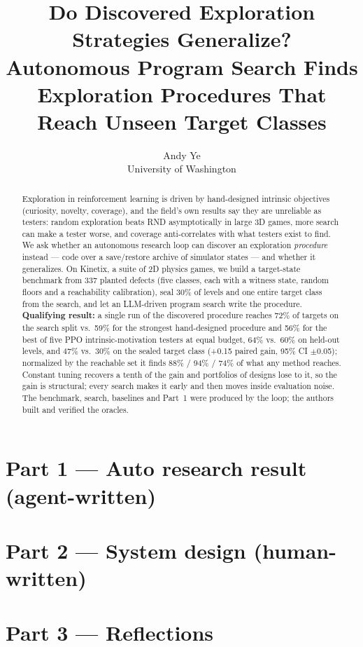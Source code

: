 \documentclass[10pt]{article}
\title{Do Discovered Exploration Strategies Generalize?\\Autonomous Program Search Finds Exploration Procedures That Reach Unseen Target Classes}
\author{Andy Ye \\ University of Washington}
\begin{document}
\maketitle
\begin{abstract}
Exploration in reinforcement learning is driven by hand-designed intrinsic objectives (curiosity, novelty, coverage), and the
field's own results say they are unreliable as testers: random exploration beats RND asymptotically in large 3D games, more search
can make a tester worse, and coverage anti-correlates with what testers exist to find. We ask whether an autonomous research loop can
discover an exploration \emph{procedure} instead --- code over a save/restore archive of simulator states --- and whether it generalizes.
On Kinetix, a suite of 2D physics games, we build a target-state benchmark from 337 planted defects (five classes, each with a witness
state, random floors and a reachability calibration), seal 30\% of levels and one entire target class from the search, and let an
LLM-driven program search write the procedure. \textbf{Qualifying result:} a single run of the discovered procedure reaches 72\% of
targets on the search split vs.\ 59\% for the strongest hand-designed procedure and 56\% for the best of five PPO intrinsic-motivation
testers at equal budget, 64\% vs.\ 60\% on held-out levels, and 47\% vs.\ 30\% on the sealed target class (+0.15 paired gain, 95\% CI
$\pm$0.05); normalized by the reachable set it finds 88\% / 94\% / 74\% of what any method reaches. Constant tuning recovers a tenth
of the gain and portfolios of designs lose to it, so the gain is structural; every search makes it early and then moves inside
evaluation noise. The benchmark, search, baselines and Part~1 were produced by the loop; the authors built and verified the oracles.
\end{abstract}

\section*{Part 1 --- Auto research result (agent-written)}


\section*{Part 2 --- System design (human-written)}


\section*{Part 3 --- Reflections}




\end{document}
